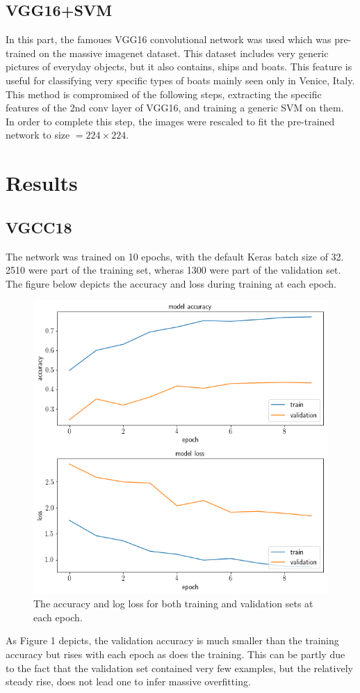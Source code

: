 \documentclass[12pt,a4paper]{article}
\begin{document}
\subsection{VGG16+SVM}
In this part, the famoues VGG16 convolutional network was used which was pre-trained on the massive imagenet dataset. This dataset includes very generic pictures of everyday objects, but it also contains, ships and boats. This feature is useful for classifying very specific types of boats mainly seen only in Venice, Italy. This method is compromised of the following steps, extracting the specific features of the 2nd conv layer of VGG16, and training a generic SVM on them. In order to complete this step, the images were rescaled to fit the pre-trained network to size $=224 \times 224$.


\section{Results}
\subsection{VGCC18}
The network was trained on 10 epochs, with the default Keras batch size of 32. 2510 were part of the training set, wheras 1300 were part of the validation set. The figure below depicts the accuracy and loss during training at each epoch.

\begin{figure}[htbp]
\begin{center}
\includegraphics[width=0.75\columnwidth, angle = 0]{img/vgcc18.png}
\end{center}
\caption{The accuracy and log loss for both training and validation sets at each epoch.}
\label{img:1roc1}
\end{figure}
As Figure 1 depicts, the validation accuracy is much smaller than the training accuracy but rises with each epoch as does the training. This can be partly due to the fact that the validation set contained very few examples, but the relatively steady rise, does not lead one to infer massive overfitting.
\end{document}
